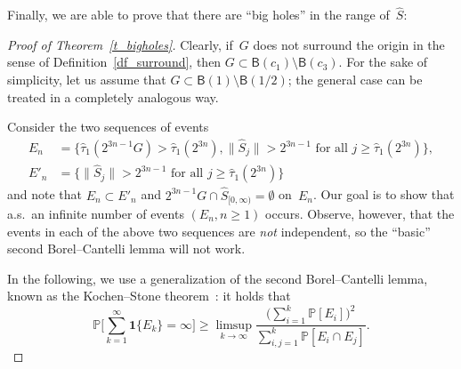\documentclass[11pt]{article}
\theoremstyle{definition}
\numberwithin{equation}{section}
\numberwithin{figure}{section}
\numberwithin{table}{section}
\newcommand{\1}[1]{{\mathbf 1}{\{#1\}}}
\newcommand{\s}{{\widehat S}}
\newcommand{\8}{{\infty}}
\newcommand{\IP}{{\mathbb P}}
\newcommand{\htau}{\widehat{\tau}}
\newcommand{\B}{{\mathsf B}}
\begin{document}
Finally, we are able to prove that there are ``big holes'' in the range of~$\s$:
\begin{proof}[Proof of Theorem~\ref{t_bigholes}]
Clearly, if~$G$ does not surround the origin in the sense of Definition~\ref{df_surround}, then $G\subset \B(c_1)\setminus \B(c_3)$. For the sake of simplicity, let us assume that $G\subset\B(1)\setminus \B(1/2)$; the general case can be treated in a completely analogous way.

Consider the two sequences of events
\begin{align*}
E_n &= \big\{\htau_1(2^{3n-1}G)>\htau_1(2^{3n}),
\|\s_j\| > 2^{3n-1} \text{ for all } j\geq \htau_1(2^{3n})\big\},\\
E'_n &= \big\{
\|\s_j\| > 2^{3n-1} \text{ for all } j\geq \htau_1(2^{3n})\big\}
\end{align*}
and note that $E_n\subset E'_n$ and $2^{3n-1}G\cap \s_{[0,\infty)}=\emptyset$ on~$E_n$. Our goal is to show that a.s.\ an infinite number of events $(E_n, n\geq 1)$ occurs. Observe, however, that the events in each of the above two sequences are \emph{not} independent, so the ``basic'' second Borel--Cantelli lemma will not work.

In the following, we use a generalization of the second Borel--Cantelli lemma, known as the Kochen--Stone theorem~\cite{KS64}: it holds that
\begin{equation}\label{Kochen--Stone}
\IP\Big[\sum_{k=1}^\infty \1{E_k}=\infty\Big] \geq
\limsup_{k\to\infty} \frac{\big(\sum_{i=1}^k\IP[E_i]\big)^2} {\sum_{i,j=1}^k\IP[E_i\cap E_j]}.
\end{equation}


\end{proof}
\end{document}
